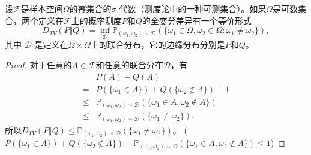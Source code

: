 \begin{lemma}
    设$\mathcal{F}$是样本空间$\Omega$的幂集合的$\sigma$-代数（测度论中的一种可测集合）。如果$\Omega$是可数集合，两个定义在$\mathcal{F}$上的概率测度$P$和$Q$的全变分差异有一个等价形式
    \begin{equation}
        D_{TV}(P \Vert Q) = \inf_{\mathcal{D}} \mathbb{P}_{(\omega_1, \omega_2) \sim \mathcal{D}}(\{\omega_1 \in \Omega, \omega_2 \in \Omega : \omega_1 \ne \omega_2\}),
    \end{equation}
    其中 $\mathcal{D}$ 是定义在$\Omega \times \Omega$上的联合分布，它的边缘分布分别是$P$和$Q$。
\end{lemma}
\begin{proof}
    对于任意的$A \in \mathcal{F}$和任意的联合分布$\mathcal{D}$，有
    \begin{align*}
        &P(A) - Q(A)\\
        =& P(\{\omega_1 \in A\}) + Q(\{\omega_2 \notin A\}) - 1\\
        \le& \mathbb{P}_{(\omega_1, \omega_2)\sim\mathcal{D}}(\{\omega_1 \in A, \omega_2 \notin A\}) \\
        \le& \mathbb{P}_{(\omega_1, \omega_2)\sim\mathcal{D}}(\{\omega_1 \ne \omega_2\}).
    \end{align*}
    所以$D_{TV}(P \Vert Q) \le \mathbb{P}_{(\omega_1, \omega_2)\sim\mathcal{D}}(\{\omega_1 \ne \omega_2\})$。
    ($P(\{\omega_1 \in A\}) + Q(\{\omega_2 \notin A\}) - \mathbb{P}_{(\omega_1, \omega_2)\sim\mathcal{D}}(\{\omega_1 \in A, \omega_2 \notin A\}) \le 1$)


\end{proof}
